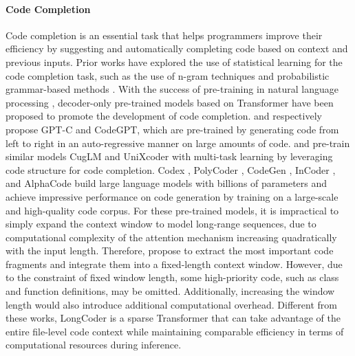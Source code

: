\documentclass{article}
\begin{document}
\paragraph{Code Completion}
Code completion is an essential task that helps programmers improve their efficiency by suggesting and automatically completing code based on context and previous inputs. Prior works have explored the use of statistical learning for the code completion task, such as the use of n-gram techniques \cite{tu2014localness,hindle2016naturalness} and probabilistic grammar-based methods \cite{allamanis2014mining,bielik2016phog,
raychev2016probabilistic,hellendoorn2017deep}. With the  success of pre-training in natural language processing \cite{devlin2018bert,radford2019language,brown2020language},  decoder-only pre-trained models based on Transformer have been proposed to promote the development of code completion.  \citet{svyatkovskiy2020intellicode} and \citet{lu2021codexglue} respectively propose GPT-C and CodeGPT, which are pre-trained by generating code from left to right in an auto-regressive manner on large amounts of code. \citet{liu2020multi} and \citet{guo2022unixcoder} pre-train similar models CugLM and UniXcoder with multi-task learning by leveraging code structure for code completion. Codex \cite{chen2021evaluating}, PolyCoder \cite{xu2022systematic}, CodeGen \cite{nijkamp2022conversational}, InCoder \cite{fried2022incoder}, and AlphaCode \cite{li2022competition} build large language models with 
billions of
parameters and achieve impressive performance on code generation by training on a large-scale and high-quality code corpus. For these pre-trained models, it is impractical to simply expand the context window to model long-range sequences, due to computational complexity of the attention mechanism increasing quadratically with the input length. Therefore, \citet{clement2021long} propose to extract the most important code fragments and integrate them into a fixed-length context window. However, due to the constraint of fixed window length, some high-priority code, such as class and function definitions, may be omitted. Additionally, increasing the window length would also introduce additional computational overhead. Different from these works,  LongCoder is a sparse Transformer that can take advantage of the entire file-level code context while maintaining comparable efficiency in terms of computational resources during inference.
\end{document}
